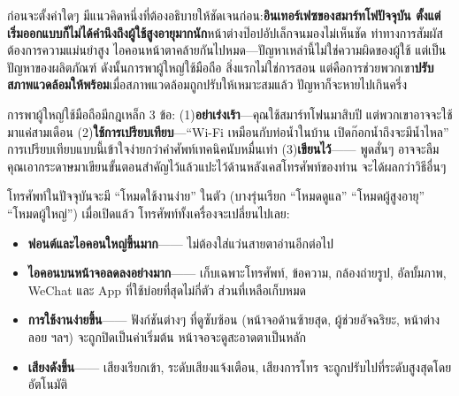 


ก่อนจะตั้งค่าใดๆ มีแนวคิดหนึ่งที่ต้องอธิบายให้ชัดเจนก่อน:\textbf{อินเทอร์เฟซของสมาร์ทโฟปัจจุบัน ตั้งแต่เริ่มออกแบบก็ไม่ได้คำนึงถึงผู้ใช้สูงอายุมากนัก}หน้าต่างป๊อปอัปเล็กจนมองไม่เห็นชัด ท่าทางการสัมผัสต้องการความแม่นยำสูง ไอคอนหน้าตาคล้ายกันไปหมด—ปัญหาเหล่านี้ไม่ใช่ความผิดของผู้ใช้ แต่เป็นปัญหาของผลิตภัณฑ์ ดังนั้นการพาผู้ใหญ่ใช้มือถือ สิ่งแรกไม่ใช่การสอน แต่คือการช่วยพวกเขา\textbf{ปรับสภาพแวดล้อมให้พร้อม}เมื่อสภาพแวดล้อมถูกปรับให้เหมาะสมแล้ว ปัญหาก็จะหายไปเกินครึ่ง

การพาผู้ใหญ่ใช้มือถือมีกฎเหล็ก 3 ข้อ: (1)\textbf{อย่าเร่งเร้า}—คุณใช้สมาร์ทโฟนมาสิบปี แต่พวกเขาอาจจะใช้มาแค่สามเดือน (2)\textbf{ใช้การเปรียบเทียบ}—“Wi-Fi เหมือนกับท่อน้ำในบ้าน เปิดก๊อกน้ำถึงจะมีน้ำไหล” การเปรียบเทียบแบบนี้เข้าใจง่ายกว่าคำศัพท์เทคนิคนับหมื่นเท่า (3)\textbf{เขียนไว้}—— พูดสั่นๆ อาจจะลืม คุณเอากระดาษมาเขียนขั้นตอนสำคัญไว้แล้วแปะไว้ด้านหลังเคสโทรศัพท์ของท่าน จะได้ผลกว่าวิธีอื่นๆ


โทรศัพท์ในปัจจุบันจะมี “โหมดใช้งานง่าย” ในตัว (บางรุ่นเรียก “โหมดดูแล” “โหมดผู้สูงอายุ” “โหมดผู้ใหญ่”) เมื่อเปิดแล้ว โทรศัพท์ทั้งเครื่องจะเปลี่ยนไปเลย:

\begin{itemize}
  \item \textbf{ฟอนต์และไอคอนใหญ่ขึ้นมาก}—— ไม่ต้องใส่แว่นสายตาอ่านอีกต่อไป
  \item \textbf{ไอคอนบนหน้าจอลดลงอย่างมาก}—— เก็บเฉพาะโทรศัพท์, ข้อความ, กล้องถ่ายรูป, อัลบั้มภาพ, WeChat และ App ที่ใช้บ่อยที่สุดไม่กี่ตัว ส่วนที่เหลือเก็บหมด
  \item \textbf{การใช้งานง่ายขึ้น}—— ฟังก์ชันต่างๆ ที่ดูซับซ้อน (หน้าจอด้านซ้ายสุด, ผู้ช่วยอัจฉริยะ, หน้าต่างลอย ฯลฯ) จะถูกปิดเป็นค่าเริ่มต้น หน้าจอจะดูสะอาดตาเป็นหลัก
  \item \textbf{เสียงดังขึ้น}—— เสียงเรียกเข้า, ระดับเสียงแจ้งเตือน, เสียงการโทร จะถูกปรับไปที่ระดับสูงสุดโดยอัตโนมัติ
\end{itemize}

